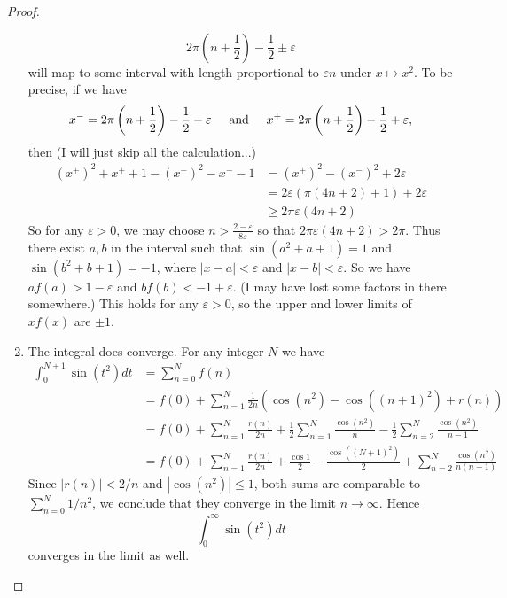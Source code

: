 \documentclass[12pt]{article}
\theoremstyle{remark}
\theoremstyle{named}
\newcommand{\e}{\varepsilon}
\newcommand{\abs}[1]{|#1|}
\begin{document}
\begin{proof}
\begin{enumerate}
        \[2 \pi \left(n + \frac 1 2\right) - \frac 1 2 \pm \e\]
        will map to some interval with length proportional to \(\e n\) under \(x \mapsto x^2\). To be precise, if we have 
        \[x^- = 2 \pi \left(n + \frac 1 2\right) - \frac 1 2 - \e \hspace*{5mm} \text{and} \hspace*{5mm} x^+ = 2 \pi \left(n + \frac 1 2\right) - \frac 1 2 + \e,\]
        then (I will just skip all the calculation...)
        \begin{align*}
            (x^+)^2 + x^+ + 1 - (x^-)^2 - x^- - 1 &= (x^+)^2 - (x^-)^2 + 2\e \\
            &= 2\e(\pi (4n + 2) + 1) + 2\e \\
            &\ge 2\pi \e (4n + 2)
        \end{align*}
        So for any \(\e > 0\), we may choose \(n > \frac{2 - \e}{8\e}\) so that \(2\pi \e (4n + 2) > 2\pi\). Thus there exist \(a, b\) in the interval such that \(\sin(a^2 + a + 1) = 1\) and \(\sin(b^2 + b + 1) = -1\), where \(\abs{x - a} < \e\) and \(\abs{x - b} < \e\). So we have \(af(a) > 1 - \e\) and \(bf(b) < -1 + \e\). (I may have lost some factors in there somewhere.) This holds for any \(\e > 0\), so the upper and lower limits of \(xf(x)\) are \(\pm 1\).
        \item The integral does converge. For any integer \(N\) we have 
        \begin{align*}
            \int_0^{N + 1} \sin(t^2)dt &= \sum_{n = 0}^N f(n) \\
            &= f(0) + \sum_{n = 1}^N \frac{1}{2n}\left(\cos(n^2) - \cos((n + 1)^2) + r(n)\right) \\
            &= f(0) + \sum_{n = 1}^N \frac{r(n)}{2n} + \frac 1 2 \sum_{n = 1}^N \frac{\cos(n^2)}{n} - \frac 1 2 \sum_{n = 2}^N \frac{\cos(n^2)}{n - 1} \\
            &= f(0) + \sum_{n = 1}^N \frac{r(n)}{2n} + \frac{\cos 1}{2} - \frac{\cos((N + 1)^2)}{2} + \sum_{n = 2}^N \frac{\cos(n^2)}{n(n - 1)}
        \end{align*}
        Since \(\abs{r(n)} < 2/n\) and \(\abs{\cos(n^2)} \le 1\), both sums are comparable to \(\sum_{n = 0}^N 1 / n^2\), we conclude that they converge in the limit \(n \to \infty\). Hence \[\int_0^\infty \sin(t^2)dt\] converges in the limit as well.
    \end{enumerate}
\end{proof}
\end{document}
